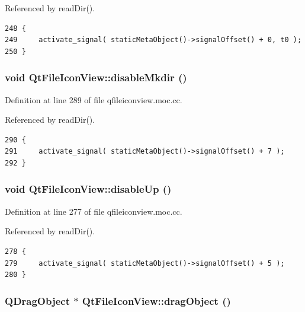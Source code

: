 Referenced by read\-Dir().



\footnotesize\begin{verbatim}248 {
249     activate_signal( staticMetaObject()->signalOffset() + 0, t0 );
250 }
\end{verbatim}\normalsize 
{}
\subsubsection{\setlength{\rightskip}{0pt plus 5cm}void Qt\-File\-Icon\-View::disable\-Mkdir ()\hspace{0.3cm}{\tt  [signal]}}\label{classQtFileIconView_QtFileIconViewl7}




Definition at line 289 of file qfileiconview.moc.cc.

Referenced by read\-Dir().



\footnotesize\begin{verbatim}290 {
291     activate_signal( staticMetaObject()->signalOffset() + 7 );
292 }
\end{verbatim}\normalsize 
{}
\subsubsection{\setlength{\rightskip}{0pt plus 5cm}void Qt\-File\-Icon\-View::disable\-Up ()\hspace{0.3cm}{\tt  [signal]}}\label{classQtFileIconView_QtFileIconViewl5}




Definition at line 277 of file qfileiconview.moc.cc.

Referenced by read\-Dir().



\footnotesize\begin{verbatim}278 {
279     activate_signal( staticMetaObject()->signalOffset() + 5 );
280 }
\end{verbatim}\normalsize 
{}
\subsubsection{\setlength{\rightskip}{0pt plus 5cm}QDrag\-Object $\ast$ Qt\-File\-Icon\-View::drag\-Object ()\hspace{0.3cm}{\tt  [protected, virtual]}}\label{classQtFileIconView_QtFileIconViewb1}




